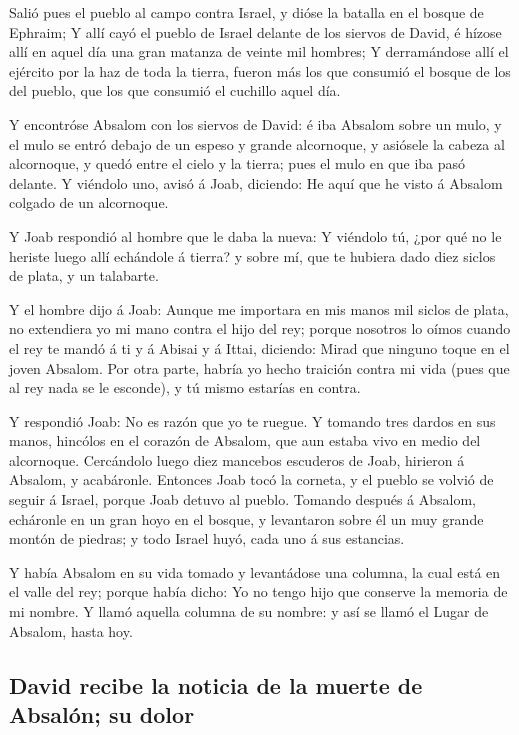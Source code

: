  Salió pues el pueblo al campo contra Israel, y dióse la
batalla en el bosque de Ephraim;  Y allí cayó el pueblo de
Israel delante de los siervos de David, é hízose allí en aquel día una
gran matanza de veinte mil hombres;  Y derramándose allí
el ejército por la haz de toda la tierra, fueron más los que consumió el
bosque de los del pueblo, que los que consumió el cuchillo aquel día.

 Y encontróse Absalom con los siervos de David: é iba
Absalom sobre un mulo, y el mulo se entró debajo de un espeso y grande
alcornoque, y asiósele la cabeza al alcornoque, y quedó entre el cielo y
la tierra; pues el mulo en que iba pasó delante.  Y
viéndolo uno, avisó á Joab, diciendo: He aquí que he visto á Absalom
colgado de un alcornoque.

 Y Joab respondió al hombre que le daba la nueva: Y
viéndolo tú, ¿por qué no le heriste luego allí echándole á tierra? y
sobre mí, que te hubiera dado diez siclos de plata, y un talabarte.

 Y el hombre dijo á Joab: Aunque me importara en mis
manos mil siclos de plata, no extendiera yo mi mano contra el hijo del
rey; porque nosotros lo oímos cuando el rey te mandó á ti y á Abisai y á
Ittai, diciendo: Mirad que ninguno toque en el joven Absalom.
 Por otra parte, habría yo hecho traición contra mi vida
(pues que al rey nada se le esconde), y tú mismo estarías en contra.

 Y respondió Joab: No es razón que yo te ruegue. Y
tomando tres dardos en sus manos, hincólos en el corazón de Absalom, que
aun estaba vivo en medio del alcornoque.  Cercándolo
luego diez mancebos escuderos de Joab, hirieron á Absalom, y acabáronle.
 Entonces Joab tocó la corneta, y el pueblo se volvió de
seguir á Israel, porque Joab detuvo al pueblo.  Tomando
después á Absalom, echáronle en un gran hoyo en el bosque, y levantaron
sobre él un muy grande montón de piedras; y todo Israel huyó, cada uno á
sus estancias.

 Y había Absalom en su vida tomado y levantádose una
columna, la cual está en el valle del rey; porque había dicho: Yo no
tengo hijo que conserve la memoria de mi nombre. Y llamó aquella columna
de su nombre: y así se llamó el Lugar de Absalom, hasta hoy.

\hypertarget{david-recibe-la-noticia-de-la-muerte-de-absaluxf3n-su-dolor}{%
\subsection{David recibe la noticia de la muerte de Absalón; su
dolor}\label{david-recibe-la-noticia-de-la-muerte-de-absaluxf3n-su-dolor}}

